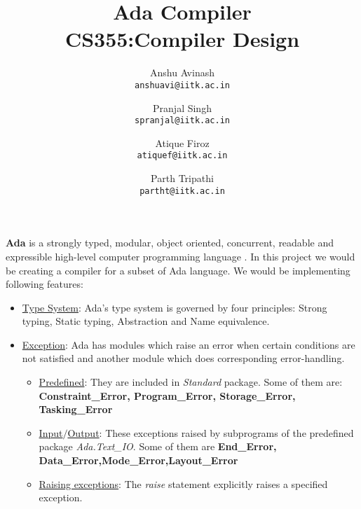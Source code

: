 \documentclass{article}
\title{
Ada Compiler \\
CS355:Compiler Design
}
\author{
Anshu Avinash\\
\texttt{anshuavi@iitk.ac.in}
\and
Pranjal Singh\\
\texttt{spranjal@iitk.ac.in}
\and
Atique Firoz\\
\texttt{atiquef@iitk.ac.in}
\and
Parth Tripathi\\
\texttt{partht@iitk.ac.in}
}
\begin{document}
\maketitle
\textbf{Ada} is a strongly typed, modular, object oriented, concurrent, readable and expressible high-level computer programming language \cite{AdaIC}. In this project we would be creating a compiler for a subset of Ada language. We would be implementing following features:
\begin{itemize}
	\item \uline{Type System}: Ada's type system is governed by four principles: Strong typing, Static typing, Abstraction and Name equivalence.
	\item \uline{Exception}: Ada has modules which raise an error when certain conditions are not satisfied and another module which does corresponding error-handling.
	\begin{itemize}
		\item \uline{Predefined}: They are included in \emph{Standard} package. Some of them are: \textbf{Constraint\_Error, Program\_Error, Storage\_Error, Tasking\_Error}
		\item \uline{Input$/$Output}: These exceptions raised by subprograms of the predefined package \emph{Ada.Text\_IO}. Some of them are \textbf{End\_Error, Data\_Error,Mode\_Error,Layout\_Error}
		\item \uline{Raising exceptions}: The \emph{raise} statement explicitly raises a specified exception.
	\end{itemize}
\end{itemize}
\printbibliography
\end{document}

